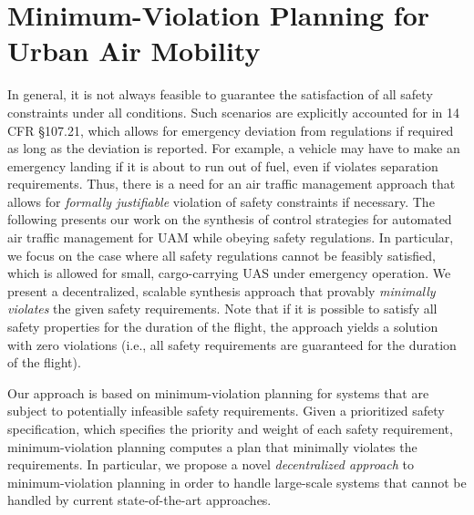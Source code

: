 \chapter{Minimum-Violation Planning for Urban Air Mobility}
In general, it is not always feasible to guarantee the satisfaction of all safety constraints under all conditions. Such scenarios are explicitly accounted for in 14 CFR \S 107.21, which allows for emergency deviation from regulations if required as long as the deviation is reported. For example, a vehicle may have to make an emergency landing if it is about to run out of fuel, even if violates separation requirements. Thus, there is a need for an air traffic management approach that allows for \emph{formally justifiable} violation of safety constraints if necessary. The following presents our work on the synthesis of control strategies for automated air traffic management for UAM while obeying safety regulations. In particular, we focus on the case where all safety regulations cannot be feasibly satisfied, which is allowed for small, cargo-carrying UAS under emergency operation. We present a decentralized, scalable synthesis approach that provably \emph{minimally violates} the given safety requirements.  Note that if it is possible to satisfy all safety properties for the duration of the flight, the approach yields a solution with zero violations (i.e., all safety requirements are guaranteed for the duration of the flight). 

Our approach is based on minimum-violation planning for systems that are subject to potentially infeasible safety requirements. Given a prioritized safety specification, which specifies the priority and weight of each safety requirement, minimum-violation planning computes a plan that minimally violates the requirements. In particular, we propose a novel \emph{decentralized approach} to minimum-violation planning in order to handle large-scale systems that cannot be handled by current state-of-the-art approaches. 

%
%


%




